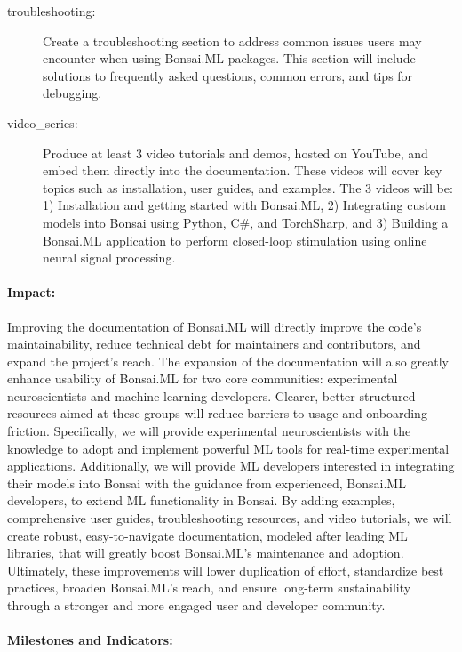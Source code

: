 \begin{description}
    \item[troubleshooting:] Create a troubleshooting section to address common issues users may encounter when using Bonsai.ML packages. This section will include solutions to frequently asked questions, common errors, and tips for debugging.
    
    \item[video\_series:] Produce at least 3 video tutorials and demos, hosted on YouTube, and embed them directly into the documentation. These videos will cover key topics such as installation, user guides, and examples. The 3 videos will be: 1) Installation and getting started with Bonsai.ML, 2) Integrating custom models into Bonsai using Python, C\#, and TorchSharp, and 3) Building a Bonsai.ML application to perform closed-loop stimulation using online neural signal processing.

\end{description}

\paragraph{Impact:}
Improving the documentation of Bonsai.ML will directly improve the code's maintainability, reduce technical debt for maintainers and contributors, and expand the project's reach. The expansion of the documentation will also greatly enhance usability of Bonsai.ML for two core communities: experimental neuroscientists and machine learning developers. Clearer, better-structured resources aimed at these groups will reduce barriers to usage and onboarding friction. Specifically, we will provide experimental neuroscientists with the knowledge to adopt and implement powerful ML tools for real-time experimental applications. Additionally, we will provide ML developers interested in integrating their models into Bonsai with the guidance from experienced, Bonsai.ML developers, to extend ML functionality in Bonsai. By adding examples, comprehensive user guides, troubleshooting resources, and video tutorials, we will create robust, easy-to-navigate documentation, modeled after leading ML libraries, that will greatly boost Bonsai.ML's maintenance and adoption. Ultimately, these improvements will lower duplication of effort, standardize best practices, broaden Bonsai.ML's reach, and ensure long-term sustainability through a stronger and more engaged user and developer community.

\paragraph{Milestones and Indicators:}\mbox{}\\

